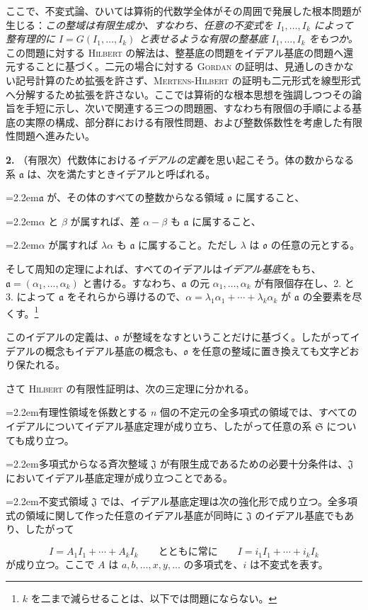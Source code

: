 \documentclass[11pt]{article}
\newcommand{\ma}{\mathfrak a}
\newcommand{\mo}{\mathfrak o}
\newcommand{\mS}{\mathfrak S}
\newcommand{\mJ}{\mathfrak J}
\newcommand{\PXXIIIitem}[2]{\par\noindent\hangindent=2.2em\hangafter=1\makebox[2.2em][l]{#1.}#2\par}
\begin{document}
ここで、不変式論、ひいては算術的代数学全体がその周囲で発展した根本問題が生じる：\emph{この整域は有限生成か、すなわち、任意の不変式を $I_1,\ldots,I_k$ によって整有理的に $I=G(I_1,\ldots,I_k)$ と表せるような有限の整基底 $I_1,\ldots,I_k$ をもつか。} この問題に対する \textsc{Hilbert} の解法は、整基底の問題をイデアル基底の問題へ還元することに基づく。二元の場合に対する \textsc{Gordan} の証明は、見通しのきかない記号計算のため拡張を許さず、\textsc{Mertens-Hilbert} の証明も二元形式を線型形式へ分解するため拡張を許さない。ここでは算術的な根本思想を強調しつつその論旨を手短に示し、次いで関連する三つの問題圏、\mbox{すなわち有限個}の手順による基底の実際の構成、部分群における有限性問題、および整数係数性を考慮した有限性問題へ進みたい。

\textbf{2.} （有限次）代数体における\emph{イデアルの定義}を思い起こそう。体の数からなる系 $\ma$ は、次を満たすときイデアルと呼ばれる。
\PXXIIIitem{1}{$\ma$ が、その体のすべての整数からなる領域 $\mo$ に属すること、}
\PXXIIIitem{2}{$\alpha$ と $\beta$ が属すれば、差 $\alpha-\beta$ も $\ma$ に属すること、}
\PXXIIIitem{3}{$\alpha$ が属すれば $\lambda\alpha$ も $\ma$ に属すること。ただし $\lambda$ は $\mo$ の任意の元とする。}
そして周知の定理によれば、すべてのイデアルは\emph{イデアル基底}をもち、$\ma=(\alpha_1,\ldots,\alpha_k)$ と書ける。すなわち、$\ma$ の元 $\alpha_1,\ldots,\alpha_k$ が有限個存在し、2. と 3. によって $\ma$ をそれらから導けるので、$\alpha=\lambda_1\alpha_1+\cdots+\lambda_k\alpha_k$ が $\ma$ の全要素を尽くす。\footnote{$k$ を二まで減らせることは、以下では問題にならない。}

このイデアルの定義は、$\mo$ が整域をなすということだけに基づく。したがってイデアルの概念もイデアル基底の概念も、$\mo$ を任意の整域に置き換えても文字どおり保たれる。

さて \textsc{Hilbert} の有限性証明は、次の三定理に分かれる。
\PXXIIIitem{1}{有理性領域を係数とする $n$ 個の不定元の全多項式の領域では、すべてのイデアルについてイデアル基底定理が成り立ち、したがって任意の系 $\mS$ についても成り立つ。}
\PXXIIIitem{2}{多項式からなる斉次整域 $\mJ$ が有限生成であるための必要十分条件は、$\mJ$ においてイデアル基底定理が成り立つことである。}
\PXXIIIitem{3}{不変式領域 $\mJ$ では、イデアル基底定理は次の強化形で成り立つ。全多項式の領域に関して作った任意のイデアル基底が同時に $\mJ$ のイデアル基底でもあり、したがって}
\[
 I=A_1I_1+\cdots+A_kI_k
 \qquad\text{とともに常に}\qquad
 I=i_1I_1+\cdots+i_kI_k
\]
が成り立つ。ここで $A$ は $a,b,\ldots,x,y,\ldots$ の多項式を、$i$ は不変式を表す。
\end{document}
